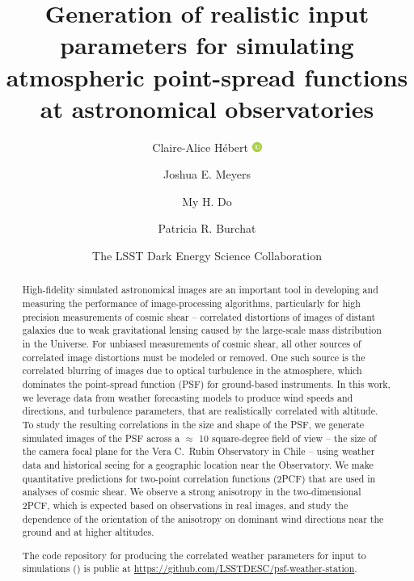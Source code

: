 \documentclass[twocolumn,twocolappendix]{openjournal}
\begin{document}
\title{Generation of realistic input parameters for simulating atmospheric point-spread functions at astronomical observatories}



\author{Claire-Alice H\'ebert \hskip2pt\href{http://orcid.org/0000-0002-7397-2690}{\includegraphics[width=9pt]{Orcid-ID.png}}}

\author{Joshua E. Meyers}

\author{My H. Do}

\author{Patricia R. Burchat}

\author{The LSST Dark Energy Science Collaboration}

\begin{abstract}
High-fidelity simulated astronomical images are an important tool in developing and measuring the performance of image-processing algorithms, particularly for high precision measurements of cosmic shear -- correlated distortions of images of distant galaxies due to weak gravitational lensing caused by the large-scale mass distribution in the Universe.  
For unbiased measurements of cosmic shear, all other sources of correlated image distortions must be modeled or removed. 
One such source is the correlated blurring of images due to optical turbulence in the atmosphere, which dominates the point-spread function (PSF) for ground-based instruments.   
In this work, we leverage data from weather forecasting models to produce wind speeds and directions, and turbulence parameters, that are realistically correlated with altitude. 
To study the resulting correlations in the size and shape of the PSF, we generate simulated images of the PSF across a $\approx$ 10 square-degree field of view -- the size of the camera focal plane for the Vera C.~Rubin Observatory in Chile -- using weather data and historical seeing for a geographic location near the Observatory. 
We make quantitative predictions for two-point correlation functions (2PCF) that are used in analyses of cosmic shear.
We observe a strong anisotropy in the two-dimensional 2PCF, which is expected based on observations in real images, and study the dependence of the orientation of the anisotropy on dominant wind directions near the ground and at higher altitudes. 

The code repository for producing the correlated weather parameters for input to simulations (\psfws) is public at \url{https://github.com/LSSTDESC/psf-weather-station}.  
\end{abstract}
\end{document}
